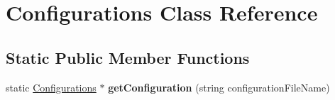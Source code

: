 \hypertarget{classConfigurations}{\section{\-Configurations \-Class \-Reference}
\label{classConfigurations}
}
\subsection*{\-Static \-Public \-Member \-Functions}
\begin{DoxyCompactItemize}
\item 
\hypertarget{classConfigurations_a06de3c16b21dc80e4a2e4dc3d533330f}{static \hyperlink{classConfigurations}{\-Configurations} $\ast$ {\bfseries get\-Configuration} (string configuration\-File\-Name)}\label{classConfigurations_a06de3c16b21dc80e4a2e4dc3d533330f}

\end{DoxyCompactItemize}

